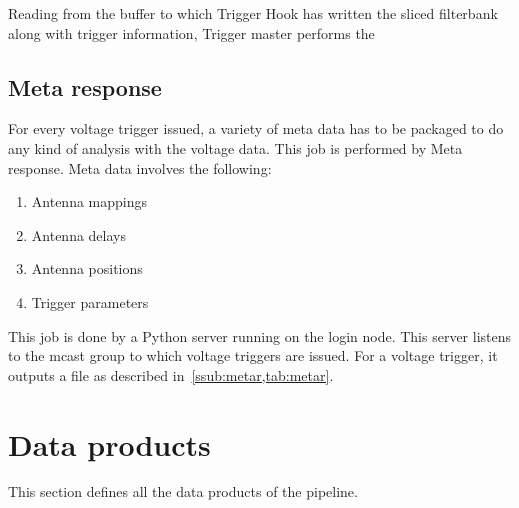 \par Reading from the buffer to which Trigger Hook has written the sliced filterbank along with trigger information, Trigger master performs the 

\subsection {Meta response}

\par For every voltage trigger issued, a variety of meta data has to be packaged to do any kind of analysis with the voltage data. 
This job is performed by Meta response. Meta data involves the following:
\begin{enumerate}
\item Antenna mappings
\item Antenna delays
\item Antenna positions
\item Trigger parameters
\end{enumerate}

\par This job is done by a Python server running on the login node. 
This server listens to the mcast group to which voltage triggers are issued.
For a voltage trigger, it outputs a  file as described in~\autoref{ssub:metar,tab:metar}.

\section {Data products}
\par This section defines all the data products of the pipeline. 
